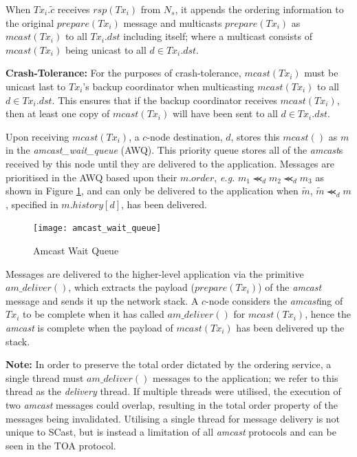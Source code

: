 \begin{enumerate}
        \leftbar
        When $Tx_i.\tilde{c}$ receives $rsp(Tx_i)$ from $N_s$, it appends the ordering information to the original $prepare(Tx_i)$ message and multicasts $prepare(Tx_i)$ as $mcast(Tx_i)$ to all $Tx_i.dst$ including itself; where a multicast consists of $mcast(Tx_i)$ being unicast to all $d \in Tx_i.dst$. 
        
        \textbf{Crash-Tolerance:} For the purposes of crash-tolerance, $mcast(Tx_i)$ must be unicast last to $Tx_i$'s backup coordinator when multicasting $mcast(Tx_i)$ to all $d \in Tx_i.dst$.  This ensures that if the backup coordinator receives $mcast(Tx_i)$, then at least one copy of $mcast(Tx_i)$ will have been sent to all $d \in Tx_i.dst$.  
        \endleftbar
        
        \leftbar
        Upon receiving $mcast(Tx_i)$, a $c$-node destination, $d$, stores this $mcast()$ as $m$ in the \emph{amcast\_wait\_queue} (AWQ).  This priority queue stores all of the \emph{amcast}s received by this node until they are delivered to the application.  Messages are prioritised in the AWQ based upon their $m.order$, \emph{e.g.} $m_1 \llcurly_d m_2 \llcurly_d m_3$ as shown in Figure \ref{fig:awq}, and can only be delivered to the application when $\tilde{m}$, $\tilde{m} \llcurly_d m$, specified in $m.history[d]$, has been delivered.  
        
         \begin{figure}[H] 
        \centering    
         \texttt{[image: amcast\_wait\_queue]}
         \caption[Amcast Wait Queue]{Amcast Wait Queue}
         \label{fig:awq}
    \end{figure}             
        \vspace{-2em}
        Messages are delivered to the higher-level application via the primitive $am\_deliver()$, which extracts the payload ($prepare(Tx_i)$) of the \emph{amcast} message and sends it up the network stack.  A $c$-node considers the \emph{amcast}ing of $Tx_i$ to be complete when it has called $am\_deliver()$ for $mcast(Tx_i)$, hence the \emph{amcast} is complete when the payload of $mcast(Tx_i)$ has been delivered up the stack.  
        
        \textbf{Note:} In order to preserve the total order dictated by the ordering service, a single thread must $am\_deliver()$ messages to the application; we refer to this thread as the \emph{delivery} thread.  If multiple threads were utilised, the execution of two \emph{amcast} messages could overlap, resulting in the total order property of the messages being invalidated.  Utilising a single thread for message delivery is not unique to \textsf{SCast}, but is instead a limitation of all \emph{amcast} protocols and can be seen in the TOA protocol.    
        

\end{enumerate}
